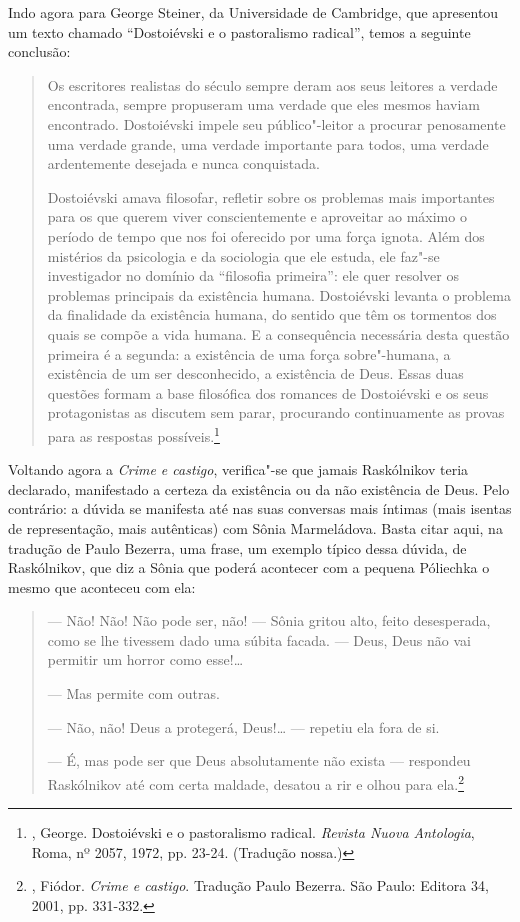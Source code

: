 Indo agora para George Steiner, da Universidade de Cambridge, que
apresentou um texto chamado ``Dostoiévski e o pastoralismo radical'',
temos a seguinte conclusão:

\begin{quotation}
Os escritores realistas do século  sempre deram aos seus leitores a
verdade encontrada, sempre propuseram uma verdade que eles mesmos haviam
encontrado. Dostoiévski impele seu público"-leitor a procurar penosamente
uma verdade grande, uma verdade importante para todos, uma verdade
ardentemente desejada e nunca conquistada.

Dostoiévski amava filosofar, refletir sobre os problemas mais
importantes para os que querem viver conscientemente e aproveitar ao
máximo o período de tempo que nos foi oferecido por uma força ignota.
Além dos mistérios da psicologia e da sociologia que ele estuda, ele
faz"-se investigador no domínio da ``filosofia primeira'': ele quer
resolver os problemas principais da existência humana. Dostoiévski
levanta o problema da finalidade da existência humana, do sentido que
têm os tormentos dos quais se compõe a vida humana. E a consequência
necessária desta questão primeira é a segunda: a existência de uma força
sobre"-humana, a existência de um ser desconhecido, a existência de Deus.
Essas duas questões formam a base filosófica dos romances de Dostoiévski
e os seus protagonistas as discutem sem parar, procurando continuamente
as provas para as respostas possíveis.\footnote{, George.
Dostoiévski e o pastoralismo radical. \emph{Revista Nuova Antologia}, Roma, nº 2057, 1972, pp. 23-24. (Tradução nossa.)}
\end{quotation}

Voltando agora a \emph{Crime e castigo}, verifica"-se que jamais
Raskólnikov teria declarado, manifestado a certeza da existência ou da
não existência de Deus. Pelo contrário: a dúvida se manifesta até nas
suas conversas mais íntimas (mais isentas de representação, mais
autênticas) com Sônia Marmeládova. Basta citar aqui, na tradução de
Paulo Bezerra, uma frase, um exemplo típico dessa dúvida, de
Raskólnikov, que diz a Sônia que poderá acontecer com a pequena Póliechka o
mesmo que aconteceu com ela:

\begin{quotation}
--- Não! Não! Não pode ser, não! --- Sônia gritou alto, feito desesperada,
como se lhe tivessem dado uma súbita facada. --- Deus, Deus não vai
permitir um horror como esse!\ldots{}

--- Mas permite com outras.

--- Não, não! Deus a protegerá, Deus!\ldots{} --- repetiu ela fora de si.

--- É, mas pode ser que Deus absolutamente não exista --- respondeu
Raskólnikov até com certa maldade, desatou a rir e olhou para
ela.\footnote{, Fiódor. \emph{Crime e castigo}. Tradução
Paulo Bezerra. São Paulo: Editora 34, 2001, pp. 331-332.}
\end{quotation}


